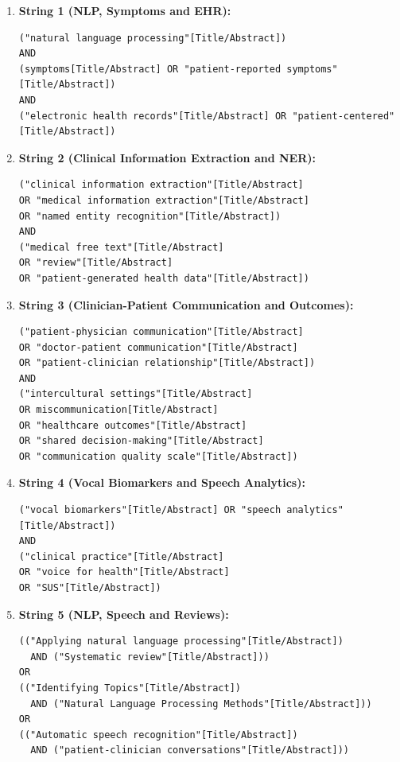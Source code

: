 \documentclass[review,12pt]{elsarticle}
\begin{document}
\begin{enumerate}
  \item \textbf{String 1 (NLP, Symptoms and EHR):}
        \begin{verbatim}
("natural language processing"[Title/Abstract])
AND
(symptoms[Title/Abstract] OR "patient-reported symptoms"[Title/Abstract])
AND
("electronic health records"[Title/Abstract] OR "patient-centered"[Title/Abstract])
        \end{verbatim}

  \item \textbf{String 2 (Clinical Information Extraction and NER):}
        \begin{verbatim}
("clinical information extraction"[Title/Abstract]
OR "medical information extraction"[Title/Abstract]
OR "named entity recognition"[Title/Abstract])
AND
("medical free text"[Title/Abstract]
OR "review"[Title/Abstract]
OR "patient-generated health data"[Title/Abstract])
        \end{verbatim}

  \item \textbf{String 3 (Clinician-Patient Communication and Outcomes):}
        \begin{verbatim}
("patient-physician communication"[Title/Abstract]
OR "doctor-patient communication"[Title/Abstract]
OR "patient-clinician relationship"[Title/Abstract])
AND
("intercultural settings"[Title/Abstract]
OR miscommunication[Title/Abstract]
OR "healthcare outcomes"[Title/Abstract]
OR "shared decision-making"[Title/Abstract]
OR "communication quality scale"[Title/Abstract])
        \end{verbatim}

  \item \textbf{String 4 (Vocal Biomarkers and Speech Analytics):}
        \begin{verbatim}
("vocal biomarkers"[Title/Abstract] OR "speech analytics"[Title/Abstract])
AND
("clinical practice"[Title/Abstract]
OR "voice for health"[Title/Abstract]
OR "SUS"[Title/Abstract])
        \end{verbatim}

  \item \textbf{String 5 (NLP, Speech and Reviews):}
        \begin{verbatim}
(("Applying natural language processing"[Title/Abstract])
  AND ("Systematic review"[Title/Abstract]))
OR
(("Identifying Topics"[Title/Abstract])
  AND ("Natural Language Processing Methods"[Title/Abstract]))
OR
(("Automatic speech recognition"[Title/Abstract])
  AND ("patient-clinician conversations"[Title/Abstract]))
        \end{verbatim}
\end{enumerate}
\end{document}
